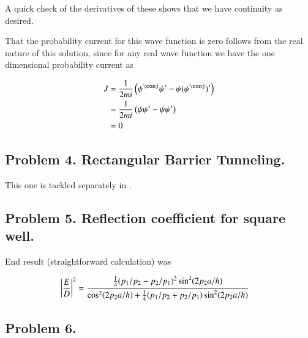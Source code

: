 \documentclass{article}
\begin{document}
A quick check of the derivatives of these shows that we have continuity as desired.

That the probability current for this wave function is zero follows from the real nature of this solution, since for any real
wave function we have the one dimensional probability current as

\begin{align*}
J 
&= \inv{2mi}\left( \psi^\conj \psi' - \psi (\psi^\conj)' \right) \\
&= \inv{2mi}\left( \psi \psi' - \psi \psi' \right) \\
&= 0
\end{align*}

\subsection{Problem 4. Rectangular Barrier Tunneling. }

This one is tackled separately in \cite{PJqmBarrier}.

\subsection{Problem 5. Reflection coefficient for square well. }

End result (straightforward calculation) was

\begin{align*}
\left\lvert{\frac{E}{D}}\right\rvert^2 &= \frac{\frac{1}{4}(p_1/p_2 - p_2/p_1)^2 \sin^2( 2 p_2 a /\hbar)}{\cos^2(2 p_2 a/\hbar) + \frac{1}{4}(p_1/p_2 + p_2/p_1) \sin^2(2 p_2 a/\hbar)}
\end{align*}

\subsection{Problem 6. }



\end{document}
